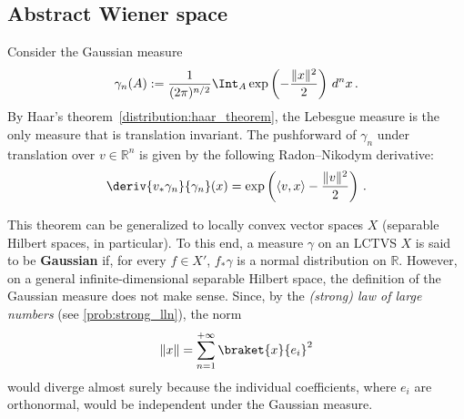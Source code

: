 

\subsection{Abstract Wiener space}

    \begin{theorem}\label{stoch:cameron_martin}
        Consider the Gaussian measure
        \begin{gather}
            \gamma_n(A) := \frac{1}{(2\pi)^{n/2}}\Int_A\exp\left(-\frac{\|x\|^2}{2}\right)\,d^nx\,.
        \end{gather}
        By Haar's theorem~\ref{distribution:haar_theorem}, the Lebesgue measure is the only measure that is translation invariant. The pushforward of $\gamma_n$ under translation over $v\in\mathbb{R}^n$ is given by the following Radon--Nikodym derivative:
        \begin{gather}
            \deriv{v_*\gamma_n}{\gamma_n}(x) = \exp\left(\langle v,x \rangle - \frac{\|v\|^2}{2}\right)\,.
        \end{gather}
    \end{theorem}

    This theorem can be generalized to locally convex vector spaces $X$ (separable Hilbert spaces, in particular). To this end, a measure $\gamma$ on an LCTVS $X$ is said to be \textbf{Gaussian} if, for every $f\in X'$, $f_*\gamma$ is a normal distribution on $\mathbb{R}$. However, on a general infinite-dimensional separable Hilbert space, the definition of the Gaussian measure does not make sense. Since, by the \textit{(strong) law of large numbers} (see \cref{prob:strong_lln}), the norm
    \begin{gather}
        \|x\| = \sum_{n=1}^{+\infty}\braket{x}{e_i}^2
    \end{gather}
    would diverge almost surely because the individual coefficients, where $e_i$ are orthonormal, would be independent under the Gaussian measure.

